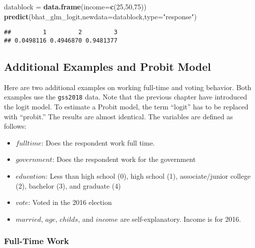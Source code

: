 \documentclass[
]{article}
\newenvironment{Shaded}{\begin{snugshade}}{\end{snugshade}}
\newcommand{\DataTypeTok}[1]{\textcolor[rgb]{0.13,0.29,0.53}{#1}}
\newcommand{\DecValTok}[1]{\textcolor[rgb]{0.00,0.00,0.81}{#1}}
\newcommand{\KeywordTok}[1]{\textcolor[rgb]{0.13,0.29,0.53}{\textbf{#1}}}
\newcommand{\NormalTok}[1]{#1}
\newcommand{\StringTok}[1]{\textcolor[rgb]{0.31,0.60,0.02}{#1}}
\providecommand{\tightlist}{%
  \setlength{\itemsep}{0pt}\setlength{\parskip}{0pt}}
\begin{document}
\begin{Shaded}
\begin{Highlighting}[]
\NormalTok{datablock =}\StringTok{ }\KeywordTok{data.frame}\NormalTok{(}\DataTypeTok{income=}\KeywordTok{c}\NormalTok{(}\DecValTok{25}\NormalTok{,}\DecValTok{50}\NormalTok{,}\DecValTok{75}\NormalTok{))}
\KeywordTok{predict}\NormalTok{(bhat_glm_logit,}\DataTypeTok{newdata=}\NormalTok{datablock,}\DataTypeTok{type=}\StringTok{"response"}\NormalTok{)}
\end{Highlighting}
\end{Shaded}

\begin{verbatim}
##         1         2         3 
## 0.0498116 0.4946870 0.9481377
\end{verbatim}

\hypertarget{additional-examples-and-probit-model}{%
\subsection{Additional Examples and Probit Model}\label{additional-examples-and-probit-model}}

Here are two additional examples on working full-time and voting behavior. Both examples use the \texttt{gss2018} data. Note that the previous chapter have introduced the logit model. To estimate a Probit model, the term ``logit'' has to be replaced with ``probit.'' The results are almost identical. The variables are defined as follows:

\begin{itemize}
\tightlist
\item
  \(fulltime\): Does the respondent work full time.
\item
  \(government\): Does the respondent work for the government
\item
  \(education\): Less than high school (0), high school (1), associate/junior college (2), bachelor (3), and graduate (4)
\item
  \(vote\): Voted in the 2016 election
\item
  \(married\), \(age\), \(childs\), and \(income\) are self-explanatory. Income is for 2016.
\end{itemize}

\hypertarget{full-time-work}{%
\subsubsection{Full-Time Work}\label{full-time-work}}
\end{document}
